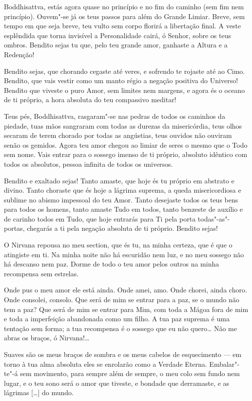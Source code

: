  Boddhisattva, estás agora quase no princípio e no fim do caminho
(sem fim nem princípio). Ouvem"-se já os teus passos para além do
Grande Limiar. Breve, sem tempo em que seja breve, teu vulto sem
corpo florirá a libertação final. A veste esplêndida que torna
invisível a Personalidade cairá, ó Senhor, sobre os teus ombros.
Bendito sejas tu que, pelo teu grande amor, ganhaste a Altura e a
Redenção!

 Bendito sejas, que chorando cegaste até veres, e sofrendo te
rojaste até ao Cimo. Bendito, que vais vestir como um manto régio a
negação positiva do Universo! Bendito que viveste o puro Amor, sem
limites nem margens, e agora és o oceano de ti próprio, a hora
absoluta do teu compassivo meditar!

 Teus pés, Boddhisattva, rasgaram"-se nas pedras de todos os caminhos
da piedade, tuas mãos sangraram com todas as durezas da misericórdia,
teus olhos secaram de terem chorado por todas as angústias, teus
ouvidos não ouviram senão os gemidos. Agora teu amor chegou ao limiar
de seres o mesmo que o Todo sem nome. Vais entrar para o sossego
imenso de ti próprio, absoluto idêntico com todos os absolutos,
pessoa infinita de todos os universos.

 Bendito e exaltado sejas! Tanto amaste, que hoje és tu próprio em
abstrato e divino. Tanto choraste que és hoje a lágrima suprema, a
queda misericordiosa e sublime no abismo impessoal do teu Amor. Tanto
desejaste todos os teus bens para todos os homens, tanto amaste Tudo
em todos, tanto benzeste de auxílio e de carinho todos em Tudo, que
hoje entrarás para Ti pela porta todas"-as"-portas, chegarás a ti pela
negação absoluta de ti próprio. Bendito sejas!

O Nirvana repousa no meu section, que és tu, na minha certeza, que é que
o atingiste em ti. Na minha noite não há escuridão nem luz, e no meu
sossego não há descanso nem paz. Dorme de todo o teu amor pelos
outros na minha recompensa sem estrelas.

 Onde pus o meu amor ele está ainda. Onde amei, amo. Onde
chorei, ainda choro. Onde consolei, consolo. Que será de mim se
entrar para a paz, se o mundo não tem a paz? Que será de mim se
entrar para Mim, com toda a Mágoa fora de mim e toda a imperfeição
abandonada como um filho. A tua paz suprema é uma tentação sem forma;
a tua recompensa é o sossego que eu não quero\ldots{} Não me abras os
braços, ó Nirvana!\ldots{}

 Suaves são os meus braços de sombra e os meus cabelos de
esquecimento --- em torno à tua alma absoluta eles se enrolarão como a
Verdade Eterna. Embalar"-te"-á sem movimento, para sempre além de
sempre, o meu colo sem fundo nem lugar, e o teu sono será o amor que
tiveste, e bondade que derramaste, e as lágrimas [\ldots{}] do mundo.

